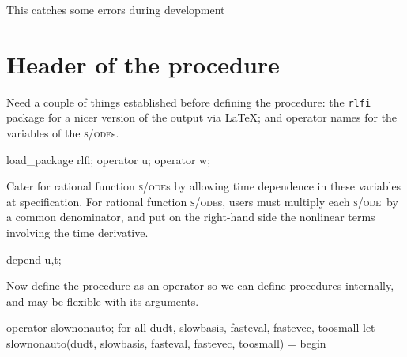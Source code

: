 \documentclass[11pt,a5paper]{article}
\def\sde{\textsc{s/ode}}
\begin{document}
%
%

This catches some errors during development




\section{Header of the procedure}

Need a couple of things established before defining the
procedure: the \verb|rlfi| package for a nicer version of
the output via \LaTeX; and operator names for the variables
of the \sde{}s.
\begin{reduce}
load_package rlfi; 
operator u;
operator w;
\end{reduce}
Cater for rational function \sde{}s by allowing time
dependence in these variables at specification. For rational
function \sde{}s, users must multiply each \sde\ by a common
denominator, and put on the right-hand side the nonlinear
terms involving the time derivative.
\begin{reduce}
depend u,t;
\end{reduce}


Now define the procedure as an operator so we can define
procedures internally, and may be flexible with its
arguments.
\begin{reduce}
operator slownonauto;
for all dudt, slowbasis, fasteval, fastevec, toosmall let
    slownonauto(dudt, slowbasis, fasteval, fastevec, toosmall) 
    = begin 
\end{reduce}
\end{document}
